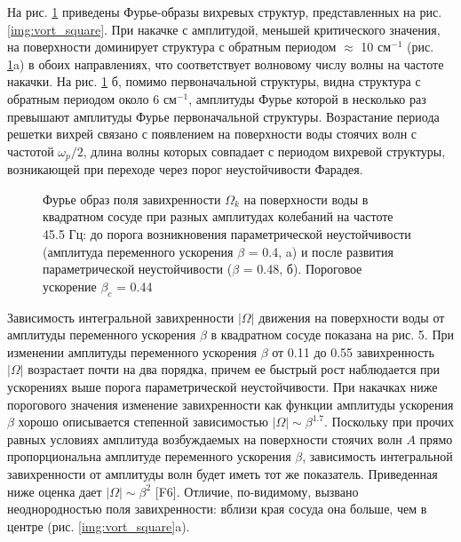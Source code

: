 На рис. \ref{img:fft_square} приведены Фурье-образы вихревых структур, представленных на рис. \ref{img:vort_square}. При накачке с амплитудой, меньшей критического значения, на поверхности доминирует структура с обратным периодом $\approx$ 10 см$^{-1}$ (рис. \ref{img:fft_square}a) в обоих направлениях, что соответствует волновому числу волны на частоте накачки. На рис. \ref{img:fft_square} б, помимо первоначальной структуры, видна структура с обратным периодом около 6 см$^{-1}$, амплитуды Фурье которой в несколько раз превышают амплитуды Фурье первоначальной структуры. Возрастание периода решетки вихрей связано с появлением на поверхности воды стоячих волн с частотой $\omega_p/2$, длина волны которых совпадает с периодом вихревой структуры, возникающей при переходе через порог неустойчивости Фарадея. 


\begin{figure}[ht]
  \begin{minipage}[ht]{0.49\linewidth}
  \end{minipage}
  \hfill
  \begin{minipage}[ht]{0.49\linewidth}
  \end{minipage}
  \caption{Фурье образ поля завихренности $\Omega_k$ на поверхности воды в квадратном сосуде при разных амплитудах колебаний на частоте 45.5 Гц: до порога возникновения параметрической неустойчивости (амплитуда переменного ускорения $\beta$ = 0.4, a) и после развития параметрической неустойчивости ($\beta$ = 0.48, б). Пороговое ускорение $\beta_c$ = 0.44}
  \label{img:fft_square}  
\end{figure}

Зависимость интегральной завихренности $|\Omega|$ движения на поверхности воды от амплитуды переменного ускорения $\beta$ в квадратном сосуде показана на рис. 5. При изменении амплитуды переменного ускорения $\beta$ от 0.11 до 0.55 завихренность $|\Omega|$ возрастает почти на два порядка, причем ее быстрый рост наблюдается при ускорениях выше порога параметрической неустойчивости. При накачках ниже порогового значения изменение завихренности как функции амплитуды ускорения $\beta$ хорошо описывается степенной зависимостью $|\Omega| \sim \beta^{1.7}$. Поскольку при прочих равных условиях амплитуда возбуждаемых на поверхности стоячих волн $A$ прямо пропорциональна амплитуде переменного ускорения $\beta$, зависимость интегральной завихренности от амплитуды волн будет иметь тот же показатель. Приведенная ниже оценка дает $|\Omega| \sim \beta^{2}$ [F6]. Отличие, по-видимому, вызвано неоднородностью поля завихренности: вблизи края сосуда она больше, чем в центре (рис. \ref{img:vort_square}a).

